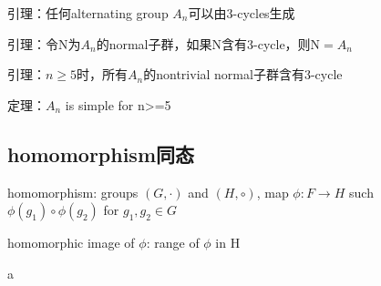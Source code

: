 \documentclass[cn,hazy,blue,screen,14pt]{note}
\begin{document}
引理：任何alternating group $A_{n}$可以由3-cycles生成

引理：令N为$A_{n}$的normal子群，如果N含有3-cycle，则N$=A_{n}$

引理：$n\geq 5$时，所有$A_{n}$的nontrivial normal子群含有3-cycle

定理：$A_{n}$ is simple for n>=5



\subsection{homomorphism同态}
homomorphism: groups $(G,\cdot)$ and $(H,\circ)$, map $\phi: F\rightarrow H$ such $\phi(g_{1})\circ\phi(g_{2})$ for $g_{1},g_{2}\in G$

homomorphic image of $\phi$: range of $\phi$ in H



















\newpage
a
\end{document}
